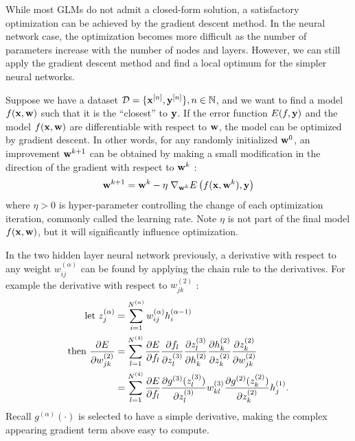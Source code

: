 \pagebreak 

While most GLMs do not admit a closed-form solution,
a satisfactory optimization can be achieved by the gradient descent method.
In the neural network case,
the optimization becomes more difficult as
the number of parameters increase with the number of nodes and layers.
However, we can still apply the gradient descent method
and find a local optimum for the simpler neural networks.

Suppose we have a dataset $\mathcal{D} = \{\mathbf{x}^{[n]}, 
\mathbf{y}^{[n]}\}, n \in \mathbb{N}$,
and we want to find a model $f(\mathbf{x},\mathbf{w})$ such that 
it is the ``closest'' to $\mathbf{y}$.
If the error function $E(f,\mathbf{y})$
and the model $f(\mathbf{x},\mathbf{w})$ are differentiable
with respect to $\mathbf{w}$,
the model can be optimized by gradient descent.
In other words, for any randomly initialized $\mathbf{w}^0$,
an improvement $\mathbf{w}^{k+1}$ can be obtained by making a 
small modification
in the direction of the gradient with respect to $\mathbf{w}^k$ :
%
\begin{equation}
	\mathbf{w}^{k+1} = \mathbf{w}^{k} - \eta \; \nabla_{\mathbf{w}^k} 
					E\left(f(\mathbf{x},\mathbf{w}^k),\mathbf{y}\right)
\end{equation}
%
where $\eta > 0$ is hyper-parameter controlling the change of 
each optimization iteration, commonly called the learning rate.
Note $\eta$ is not part of the final model $f(\mathbf{x},\mathbf{w})$,
but it will significantly influence optimization.

In the two hidden layer neural network previously,
a derivative with respect to any weight 
$w_{ij}^{(\alpha)}$ can be found
by applying the chain rule to the derivatives.
For example the derivative with respect to $w_{jk}^{(2)}$ :
%
\begin{equation}
\begin{aligned}
	\text{let } z_j^{(\alpha)} &= 
		\sum_{i=1}^{N^{(\alpha)}} w_{ij}^{(\alpha)} h_i^{(\alpha-1)} \\
	\text{then } \frac{\partial E}{\partial w_{jk}^{(2)}} &= 
		\sum_{l=1}^{N^{(4)}} \frac{\partial E}{\partial f_l}
		\frac{\partial f_l}{\partial z_l^{(3)}}
		\frac{\partial z_l^{(3)}}{\partial h_k^{(2)}}
		\frac{\partial h_k^{(2)}}{\partial z_k^{(2)}}
		\frac{\partial z_k^{(2)}}{\partial w_{jk}^{(2)}} \\
	&=
		\sum_{l=1}^{N^{(4)}} \frac{\partial E}{\partial f_l}
		\frac{\partial g^{(3)}(z_l^{(3)}) } {\partial z_l^{(3)}}
		w_{kl}^{(3)}
		\frac{\partial g^{(2)}(z_k^{(2)}) } {\partial z_k^{(2)}}
		h_j^{(1)} .
\end{aligned}
\end{equation}
%
Recall $g^{(\alpha)}(\cdot)$ is selected to have a simple derivative,
making the complex appearing gradient term above easy to compute.

